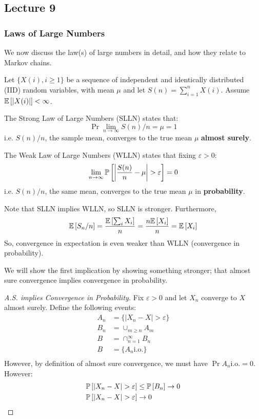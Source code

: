 \subsection{Lecture 9}

\subsubsection{Laws of Large Numbers}
We now discuss the law(s) of large numbers in detail, and how they relate to Markov chains.

\begin{theorem} 
    Let $\{X(i), i \geq 1\}$ be a sequence of independent and identically distributed (IID) random variables,
    with mean $\mu$ and let $S(n) = \sum_{i = 1}^n X(i)$. Assume $\mathbb{E}\left[ \abs{X(i)} \right] < \infty$.

    The Strong Law of Large Numbers (SLLN) states that:
    \[ \Pr{\lim_{n\to\infty} S(n)/n = \mu} = 1 \]
    i.e. $S(n)/n$, the sample mean, converges to the true mean $\mu$ \textbf{almost surely}.

    The Weak Law of Large Numbers (WLLN) states that fixing $\varepsilon > 0$:
    \[ \lim_{n \to \infty} \mathbb{P}\left[ \abs{\frac{S(n)}{n} - \mu} > \varepsilon \right] = 0 \]
    i.e. $S(n)/n$, the same mean, converges to the true mean $\mu$ in \textbf{probability}.
\end{theorem}

Note that SLLN implies WLLN, so SLLN is stronger. Furthermore, 
\[ \mathbb{E}\left[ S_n/n \right] = \frac{\mathbb{E}\left[ \sum_i X_i \right]}{n} = \frac{n \mathbb{E}\left[ X_i \right]}{n} = \mathbb{E}\left[ X_i \right] \]
So, convergence in expectation is even weaker than WLLN (convergence in probability).

We will show the first implication by showing something stronger; that almost sure convergence implies convergence in probability.

\begin{proof} [A.S. implies Convergence in Probability]
    Fix $\varepsilon > 0$ and let $X_n$ converge to $X$ almost surely. Define the following events:
    \begin{align*}
        A_n &= \{ |X_n - X| > \varepsilon \} \\
        B_n &= \cup_{m \geq n} A_m \\
        B &= \cap_{n = 1}^{\infty} B_n \\
        B &= \{ A_n \text{i.o.} \} \\
    \end{align*}
    However, by definition of almost sure convergence, we must have $\Pr{A_n \text{i.o.}} = 0$. However:
    \begin{align*}
        \mathbb{P}\left[ \abs{X_n - X} > \varepsilon \right] &\leq \mathbb{P}\left[ B_n \right] \to 0 \\
        \mathbb{P}\left[ \abs{X_n - X} > \varepsilon \right] &\to 0
    \end{align*}
\end{proof}


